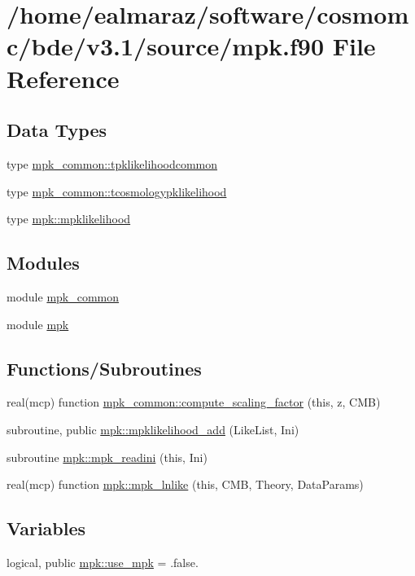 \hypertarget{mpk_8f90}{}\section{/home/ealmaraz/software/cosmomc/bde/v3.1/source/mpk.f90 File Reference}
\label{mpk_8f90}
\subsection*{Data Types}
\begin{DoxyCompactItemize}
\item 
type \mbox{\hyperlink{structmpk__common_1_1tpklikelihoodcommon}{mpk\+\_\+common\+::tpklikelihoodcommon}}
\item 
type \mbox{\hyperlink{structmpk__common_1_1tcosmologypklikelihood}{mpk\+\_\+common\+::tcosmologypklikelihood}}
\item 
type \mbox{\hyperlink{structmpk_1_1mpklikelihood}{mpk\+::mpklikelihood}}
\end{DoxyCompactItemize}
\subsection*{Modules}
\begin{DoxyCompactItemize}
\item 
module \mbox{\hyperlink{namespacempk__common}{mpk\+\_\+common}}
\item 
module \mbox{\hyperlink{namespacempk}{mpk}}
\end{DoxyCompactItemize}
\subsection*{Functions/\+Subroutines}
\begin{DoxyCompactItemize}
\item 
real(mcp) function \mbox{\hyperlink{namespacempk__common_ac0cd44f346d288d9d62e615aaa916027}{mpk\+\_\+common\+::compute\+\_\+scaling\+\_\+factor}} (this, z, C\+MB)
\item 
subroutine, public \mbox{\hyperlink{namespacempk_ae7cb8b283f9de4deefe99581fac85c0a}{mpk\+::mpklikelihood\+\_\+add}} (Like\+List, Ini)
\item 
subroutine \mbox{\hyperlink{namespacempk_ac8174e4d3727a0be4651a6e3c23a413b}{mpk\+::mpk\+\_\+readini}} (this, Ini)
\item 
real(mcp) function \mbox{\hyperlink{namespacempk_a881489521c6dfae2df332a70f188e9db}{mpk\+::mpk\+\_\+lnlike}} (this, C\+MB, Theory, Data\+Params)
\end{DoxyCompactItemize}
\subsection*{Variables}
\begin{DoxyCompactItemize}
\item 
logical, public \mbox{\hyperlink{namespacempk_adf47eff3dde9016dbf1a2749db2ec13f}{mpk\+::use\+\_\+mpk}} = .false.
\end{DoxyCompactItemize}
